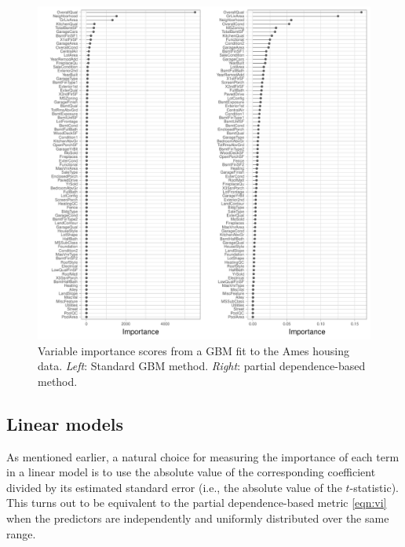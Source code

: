 \documentclass[12pt]{article}
\begin{document}
\begin{figure}[!htb]
  \centering
  \includegraphics[width=1.0\textwidth]{ames-gbm-vi-both}
  \caption{Variable importance scores from a GBM fit to the Ames housing data. \textit{Left}: Standard GBM method. \textit{Right}: partial dependence-based method. \label{fig:ames-gbm-vi-both}}
\end{figure}


\subsection{Linear models}
\label{sec:linear}

As mentioned earlier, a natural choice for measuring the importance of each term in a linear model is to use the absolute value of the corresponding coefficient divided by its estimated standard error (i.e., the absolute value of the $t$-statistic). This turns out to be equivalent to the partial dependence-based metric \eqref{eqn:vi} when the predictors are independently and uniformly distributed over the same range.
\end{document}

